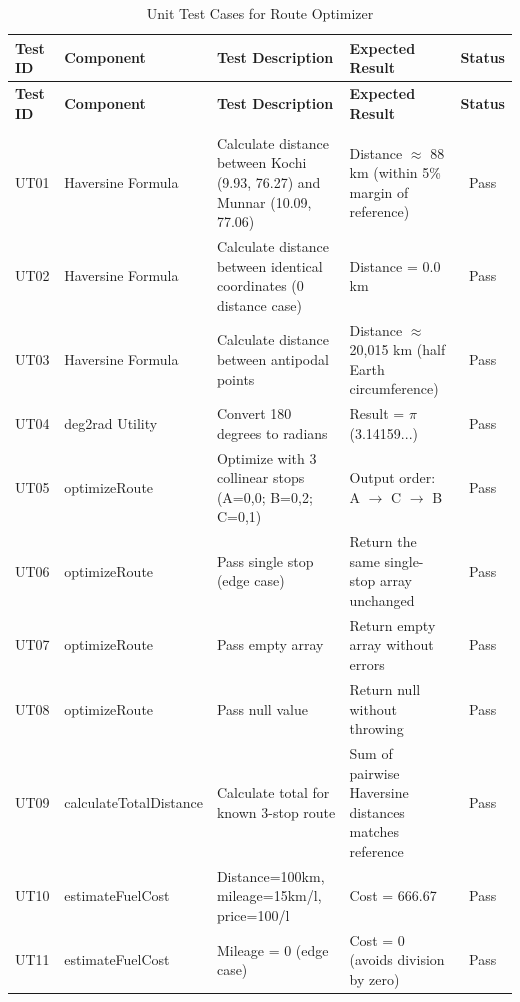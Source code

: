 \renewcommand{\arraystretch}{1.3}
\begin{longtable}{|p{1.2cm}|p{2.5cm}|p{4cm}|p{4cm}|c|}
    \hline
    \textbf{Test ID} & \textbf{Component} & \textbf{Test Description} & \textbf{Expected Result} & \textbf{Status} \\
    \hline
    \endfirsthead
    \hline
    \textbf{Test ID} & \textbf{Component} & \textbf{Test Description} & \textbf{Expected Result} & \textbf{Status} \\
    \hline
    \endhead
    \hline
    \endfoot
    \hline
    \caption{Unit Test Cases for Route Optimizer} \label{tab:unit_tests} \\
    \endlastfoot

    UT01 & Haversine Formula & Calculate distance between Kochi (9.93, 76.27) and Munnar (10.09, 77.06) & Distance $\approx$ 88 km (within 5\% margin of reference) & Pass \\
    \hline
    UT02 & Haversine Formula & Calculate distance between identical coordinates (0 distance case) & Distance = 0.0 km & Pass \\
    \hline
    UT03 & Haversine Formula & Calculate distance between antipodal points & Distance $\approx$ 20,015 km (half Earth circumference) & Pass \\
    \hline
    UT04 & deg2rad Utility & Convert 180 degrees to radians & Result = $\pi$ (3.14159...) & Pass \\
    \hline
    UT05 & optimizeRoute & Optimize with 3 collinear stops (A=0,0; B=0,2; C=0,1) & Output order: A $\rightarrow$ C $\rightarrow$ B & Pass \\
    \hline
    UT06 & optimizeRoute & Pass single stop (edge case) & Return the same single-stop array unchanged & Pass \\
    \hline
    UT07 & optimizeRoute & Pass empty array & Return empty array without errors & Pass \\
    \hline
    UT08 & optimizeRoute & Pass null value & Return null without throwing & Pass \\
    \hline
    UT09 & calculateTotalDistance & Calculate total for known 3-stop route & Sum of pairwise Haversine distances matches reference & Pass \\
    \hline
    UT10 & estimateFuelCost & Distance=100km, mileage=15km/l, price=100/l & Cost = 666.67 & Pass \\
    \hline
    UT11 & estimateFuelCost & Mileage = 0 (edge case) & Cost = 0 (avoids division by zero) & Pass \\
    \hline

\end{longtable}
